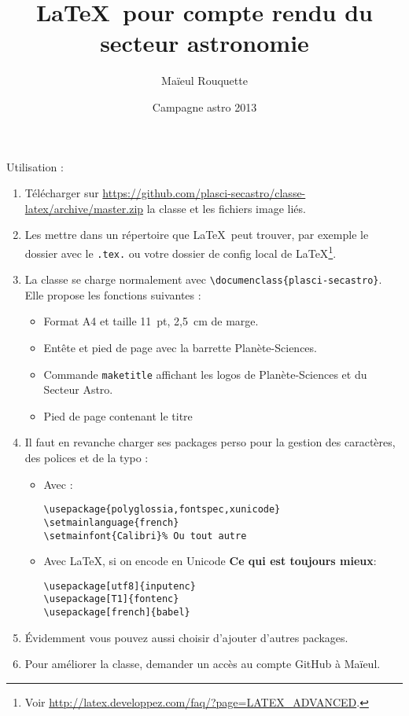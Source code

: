 \documentclass{plasci-secastro}
\date{Campagne astro 2013}
\author{Maïeul Rouquette}
\title{\LaTeX\ pour compte rendu du secteur astronomie}
\begin{document}
\maketitle

Utilisation :
\begin{enumerate}
	\item Télécharger sur \url{https://github.com/plasci-secastro/classe-latex/archive/master.zip} la classe et les fichiers image liés.
	\item Les mettre dans un répertoire que \LaTeX\ peut trouver, par exemple le dossier avec le \verb+.tex.+ ou votre dossier de config local de \LaTeX\footnote{Voir \url{http://latex.developpez.com/faq/?page=LATEX_ADVANCED}.}.
	\item La classe se charge normalement avec \verb+\documenclass{plasci-secastro}+. Elle propose les fonctions suivantes :
		\begin{itemize}
			\item Format A4 et taille 11~pt, 2,5~cm de marge.
			\item Entête et pied de page avec la barrette Planète-Sciences.
			\item Commande \verb+maketitle+ affichant les logos de Planète-Sciences et du Secteur Astro.
			\item Pied de page contenant le titre
		\end{itemize}
	\item Il faut en revanche charger ses packages perso pour la gestion des caractères, des polices et de la typo :
		\begin{itemize}
			\item Avec \XeLaTeX:
				\begin{verbatim}
\usepackage{polyglossia,fontspec,xunicode}
\setmainlanguage{french}
\setmainfont{Calibri}% Ou tout autre
				\end{verbatim}
			\item Avec \LaTeX, si on encode en Unicode \textbf{Ce qui est toujours mieux}:
				\begin{verbatim}
\usepackage[utf8]{inputenc}  
\usepackage[T1]{fontenc}
\usepackage[french]{babel}  
				\end{verbatim}
		\end{itemize}
	\item Évidemment vous pouvez aussi choisir d'ajouter d'autres packages.
	\item Pour améliorer la classe, demander un accès au compte GitHub à Maïeul.
\end{enumerate}
\end{document}
